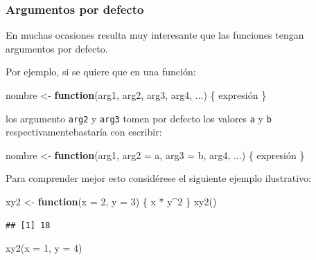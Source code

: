 \documentclass[
]{book}
\newenvironment{Shaded}{\begin{snugshade}}{\end{snugshade}}
\newcommand{\AttributeTok}[1]{\textcolor[rgb]{0.77,0.63,0.00}{#1}}
\newcommand{\ControlFlowTok}[1]{\textcolor[rgb]{0.13,0.29,0.53}{\textbf{#1}}}
\newcommand{\DecValTok}[1]{\textcolor[rgb]{0.00,0.00,0.81}{#1}}
\newcommand{\FunctionTok}[1]{\textcolor[rgb]{0.00,0.00,0.00}{#1}}
\newcommand{\NormalTok}[1]{#1}
\newcommand{\OtherTok}[1]{\textcolor[rgb]{0.56,0.35,0.01}{#1}}
\newcommand{\SpecialCharTok}[1]{\textcolor[rgb]{0.00,0.00,0.00}{#1}}
\theoremstyle{break}
\begin{document}
\hypertarget{argumentos-por-defecto}{%
\subsubsection{Argumentos por defecto}\label{argumentos-por-defecto}}

En muchas ocasiones
resulta muy interesante que las funciones tengan argumentos por defecto.

Por ejemplo, si se quiere que en una función:

\begin{Shaded}
\begin{Highlighting}[]
\NormalTok{nombre }\OtherTok{\textless{}{-}} \ControlFlowTok{function}\NormalTok{(arg1, arg2, arg3, arg4, ...) \{ expresión \}}
\end{Highlighting}
\end{Shaded}

los argumento \texttt{arg2} y \texttt{arg3} tomen por defecto los valores \texttt{a} y \texttt{b}
respectivamentebastaría con escribir:

\begin{Shaded}
\begin{Highlighting}[]
\NormalTok{nombre }\OtherTok{\textless{}{-}} \ControlFlowTok{function}\NormalTok{(arg1, }\AttributeTok{arg2 =}\NormalTok{ a, }\AttributeTok{arg3 =}\NormalTok{ b, arg4, ...) \{ expresión \}}
\end{Highlighting}
\end{Shaded}

Para comprender mejor esto considérese el siguiente ejemplo ilustrativo:

\begin{Shaded}
\begin{Highlighting}[]
\NormalTok{xy2 }\OtherTok{\textless{}{-}} \ControlFlowTok{function}\NormalTok{(}\AttributeTok{x =} \DecValTok{2}\NormalTok{, }\AttributeTok{y =} \DecValTok{3}\NormalTok{) \{ x }\SpecialCharTok{*}\NormalTok{ y}\SpecialCharTok{\^{}}\DecValTok{2}\NormalTok{ \}}
\FunctionTok{xy2}\NormalTok{()}
\end{Highlighting}
\end{Shaded}

\begin{verbatim}
## [1] 18
\end{verbatim}

\begin{Shaded}
\begin{Highlighting}[]
\FunctionTok{xy2}\NormalTok{(}\AttributeTok{x =} \DecValTok{1}\NormalTok{, }\AttributeTok{y =} \DecValTok{4}\NormalTok{)}
\end{Highlighting}
\end{Shaded}
\end{document}
